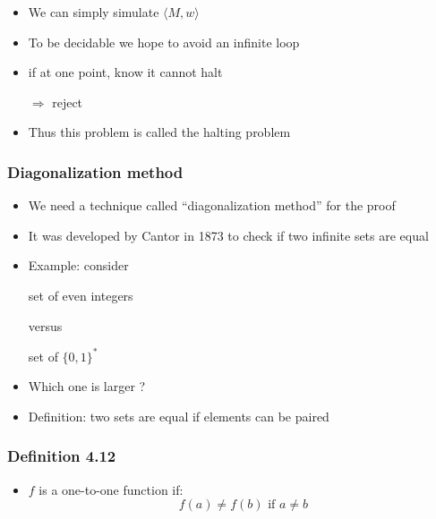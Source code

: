 \begin{frame}[allowframebreaks]
\begin{itemize}
\item We can simply simulate $\langle  M,w\rangle $
\item To be decidable we hope to avoid an infinite loop

\item [] if at one point, know it cannot halt

$\Rightarrow$ reject
\item Thus this problem is called the halting problem
\end{itemize}\end{frame} \begin{frame}[allowframebreaks] \frametitle{Diagonalization method}
  \begin{itemize}
\item We need a technique called ``diagonalization method'' for the proof
\item It was developed by Cantor  in 1873
to check if two  infinite sets are equal

\item Example: consider
  \begin{center}
  set of even integers
\end{center}
versus
\begin{center}
set of $\{0,1\}^*$
\end{center}
\item Which one is larger ?
\item Definition: two sets are equal if elements
can be paired
\end{itemize}\end{frame} \begin{frame}[allowframebreaks] \frametitle{Definition 4.12}
  \begin{itemize}
\item $f$ is a one-to-one function if:
  \begin{equation*}
f(a)\neq f(b) \text{ if } a \neq b
\end{equation*}


\end{itemize}
\end{frame}
